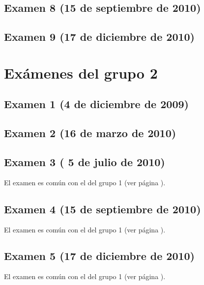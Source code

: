 \documentclass[a4paper,12pt,twoside]{book}
\begin{document}
\section{Examen 8 (15 de septiembre de 2010)}
\label{examen_09_10_1_8}
\section{Examen 9 (17 de diciembre de 2010)}
\label{examen_09_10_1_9}

\chapter{Exámenes del grupo 2}

\section{Examen 1 (4 de diciembre de 2009)}
\section{Examen 2 (16 de marzo de 2010)}
\section{Examen 3 ( 5 de julio de 2010)}
El examen es común con el del grupo 1 (ver página \pageref{examen_09_10_1_7}).
\section{Examen 4 (15 de septiembre de 2010)}
El examen es común con el del grupo 1 (ver página \pageref{examen_09_10_1_8}).
\section{Examen 5 (17 de diciembre de 2010)}
El examen es común con el del grupo 1 (ver página \pageref{examen_09_10_1_9}).

\appendix %






\nocite{Alonso-12b}
\nocite{Bird-99a}
\nocite{Cunningham-10a}
\nocite{Daume-06}
\nocite{Davie-92a}
\nocite{Doets-04a}
\nocite{Fokker-96}
\nocite{Hudak-00a}
\nocite{Hudak-12a}
\nocite{Hutton-07a}
\nocite{OSullivan-08a}
\nocite{Rabhi-99a}
\nocite{Polya-65a}
\nocite{Ruiz-04}
\nocite{Thompson-11a}



\end{document}
